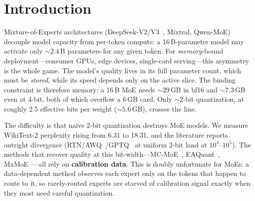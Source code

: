 \documentclass[10pt]{article}
\begin{document}
\begin{abstract}
Probing \emph{why} the KV-latent is fragile yields a law: it is a low-rank information bottleneck, and
\textbf{incoherence rotation---the foundation of QuIP\#/QTIP/QuaRot/SpinQuant---is rank-conditional},
helping full-rank tensors but catastrophic ($+1623$ ppl) on the bottleneck, which only native-basis
precision repairs. A systematic search for further data-free gains returns a unifying negative---a
load-balance-trained MoE is information-dense on weights (experts at the Gaussian rate-distortion floor),
routing (flat), and depth---so \textbf{2-bit is the floor, not a step}, and the residual ``fitting
\emph{and} fast'' prize is a decode-utilization kernel, not a better code. Applied to dense models---
including Gemma 4 12B, weeks after release---the framework generalizes with one inversion: dense 2-bit
costs more ($1.91\times$; no sparsity buffer, super-additive depth compounding), its fragility sits in the
\emph{late} layers (the opposite of the MoE, invisible to weight statistics, found by a 30-minute
functional probe), and protecting just those 12 layers at 4-bit \textbf{halves the gap to $1.45\times$} at
${\sim}4.5$\,GB resident.
\end{abstract}

\section{Introduction}\label{sec:intro}
Mixture-of-Experts architectures (DeepSeek-V2/V3~\cite{deepseekv2}, Mixtral, Qwen-MoE) decouple model capacity from
per-token compute: a 16\,B-parameter model may activate only ${\sim}2.4$\,B parameters for any given
token. For \emph{memory}-bound deployment---consumer GPUs, edge devices, single-card serving---this
asymmetry is the whole game. The model's quality lives in its full parameter count, which must be
\emph{stored}, while its speed depends only on the active slice. The binding constraint is therefore
memory: a 16\,B MoE needs ${\sim}29$\,GB in bf16 and ${\sim}7.3$\,GB even at 4-bit, both of which
overflow a 6\,GB card. Only ${\sim}2$-bit quantization, at roughly 2.5 effective bits per weight
(${\sim}5.6$\,GB), crosses the line.

The difficulty is that naive 2-bit quantization destroys MoE models. We measure WikiText-2 perplexity
rising from 6.31 to 18.31, and the literature reports outright divergence (RTN/AWQ~\cite{awq}/GPTQ~\cite{gptq}
at uniform 2-bit land at $10^4$--$10^5$). The methods that recover quality at this bit-width---MC-MoE~\cite{mcmoe},
EAQuant~\cite{eaquant}, MxMoE~\cite{mxmoe}---all rely on \textbf{calibration data}. This is doubly
unfortunate for MoEs: a data-dependent method observes each expert only on the tokens that happen to
route to it, so rarely-routed experts are starved of calibration signal exactly when they most need
careful quantization.
\end{document}
